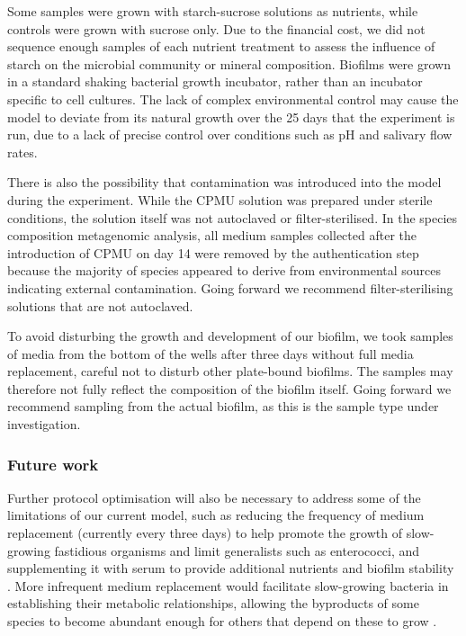 \documentclass[10pt,a4paper]{article}
\begin{document}
Some samples were grown with starch-sucrose solutions as nutrients,
while controls were grown with sucrose only. Due to the financial cost,
we did not sequence enough samples of each nutrient treatment to assess
the influence of starch on the microbial community or mineral
composition. Biofilms were grown in a standard shaking bacterial growth
incubator, rather than an incubator specific to cell cultures. The lack
of complex environmental control may cause the model to deviate from its
natural growth over the 25 days that the experiment is run, due to a
lack of precise control over conditions such as pH and salivary flow
rates.

There is also the possibility that contamination was introduced into the
model during the experiment. While the CPMU solution was prepared under
sterile conditions, the solution itself was not autoclaved or
filter-sterilised. In the species composition metagenomic analysis, all
medium samples collected after the introduction of CPMU on day 14 were
removed by the authentication step because the majority of species
appeared to derive from environmental sources indicating external
contamination. Going forward we recommend filter-sterilising solutions
that are not autoclaved.

To avoid disturbing the growth and development of our biofilm, we took
samples of media from the bottom of the wells after three days without
full media replacement, careful not to disturb other plate-bound
biofilms. The samples may therefore not fully reflect the composition of
the biofilm itself. Going forward we recommend sampling from the actual
biofilm, as this is the sample type under investigation.

\subsubsection*{Future work}\label{future-work}

Further protocol optimisation will also be necessary to address some of
the limitations of our current model, such as reducing the frequency of
medium replacement (currently every three days) to help promote the
growth of slow-growing fastidious organisms and limit generalists such
as enterococci, and supplementing it with serum to provide additional
nutrients and biofilm stability
\citep{tianUsingDGGE2010, ammannZurichBiofilm2012}. More infrequent
medium replacement would facilitate slow-growing bacteria in
establishing their metabolic relationships, allowing the byproducts of
some species to become abundant enough for others that depend on these
to grow \citep{marshDentalPlaque2005}.
\end{document}
